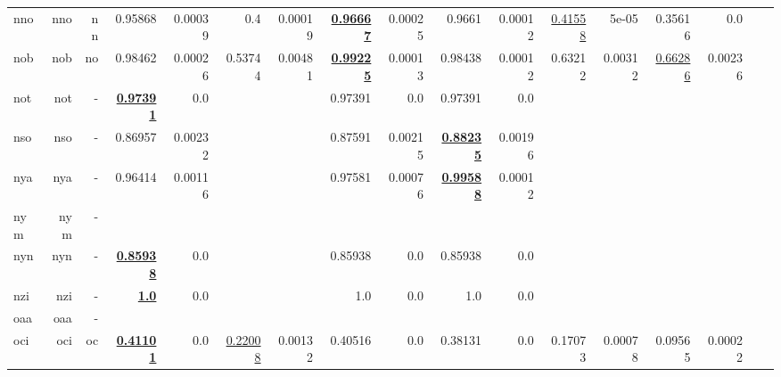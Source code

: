 \documentclass[11pt]{article}
\begin{document}
\begin{table*}[h]
{\begin{tabular}{lrrrrrrrrrrrrrrrr}
nno         & nno         & nn         & 0.95868         & 0.00039         & 0.4         & 0.00019         & \textbf{\underline{0.96667}}         & 0.00025         & 0.9661         & 0.00012         & \underline{0.41558}         & 5e-05         & 0.35616         & 0.0         \\
nob         & nob         & no         & 0.98462         & 0.00026         & 0.53744         & 0.00481         & \textbf{\underline{0.99225}}         & 0.00013         & 0.98438         & 0.00012         & 0.63212         & 0.00312         & \underline{0.66286}         & 0.00236         \\
not         & not         & -         & \textbf{\underline{0.97391}}         & 0.0         &          &          & 0.97391         & 0.0         & 0.97391         & 0.0         &          &          &          &          \\
nso         & nso         & -         & 0.86957         & 0.00232         &          &          & 0.87591         & 0.00215         & \textbf{\underline{0.88235}}         & 0.00196         &          &          &          &          \\
nya         & nya         & -         & 0.96414         & 0.00116         &          &          & 0.97581         & 0.00076         & \textbf{\underline{0.99588}}         & 0.00012         &          &          &          &          \\
nym         & nym         & -         &          &          &          &          &          &          &          &          &          &          &          &          \\
nyn         & nyn         & -         & \textbf{\underline{0.85938}}         & 0.0         &          &          & 0.85938         & 0.0         & 0.85938         & 0.0         &          &          &          &          \\
nzi         & nzi         & -         & \textbf{\underline{1.0}}         & 0.0         &          &          & 1.0         & 0.0         & 1.0         & 0.0         &          &          &          &          \\
oaa         & oaa         & -         &          &          &          &          &          &          &          &          &          &          &          &          \\
oci         & oci         & oc         & \textbf{\underline{0.41101}}         & 0.0         & \underline{0.22008}         & 0.00132         & 0.40516         & 0.0         & 0.38131         & 0.0         & 0.17073         & 0.00078         & 0.09565         & 0.00022         \\

\end{tabular}}
\end{table*}
\end{document}
